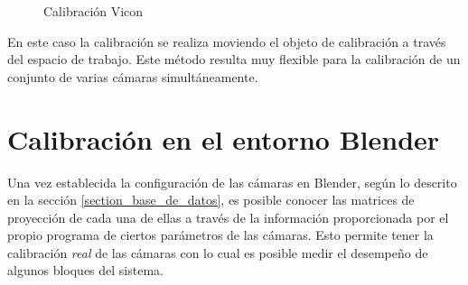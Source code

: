 \begin{figure}[ht!]
        \centering
        
        \hspace{1.8cm}
  \caption{Calibración Vicon}
      \label{vicon}
\end{figure}

En este caso la calibración se realiza moviendo el objeto de calibración a través del espacio de trabajo. Este método resulta muy flexible para la calibración de un conjunto de varias cámaras simultáneamente.


\section{Calibración en el entorno Blender}

Una vez establecida la configuración de las cámaras en  Blender, según lo descrito en la sección \ref{section_base_de_datos}, es posible conocer las matrices de proyección de cada una de ellas a través de la información proporcionada por el propio programa de ciertos parámetros de las cámaras. Esto permite tener la calibración \textit{real} de las cámaras con lo cual es posible medir el desempeño de algunos bloques del sistema.\\

